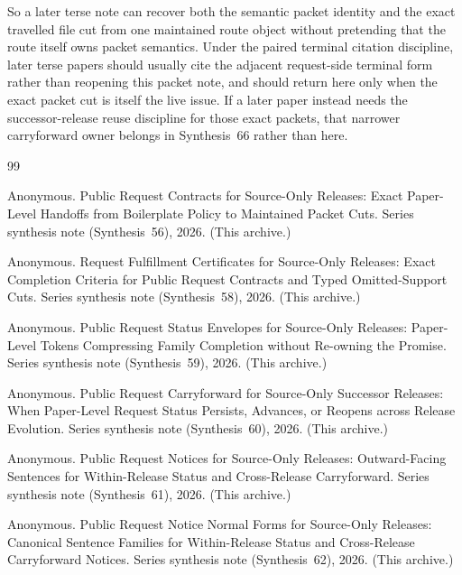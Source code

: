 \documentclass[11pt]{article}
\begin{document}
So a later terse note can recover both the semantic packet identity and the exact travelled file cut from one maintained route object without pretending that the route itself owns packet semantics. Under the paired terminal citation discipline, later terse papers should usually cite the adjacent request-side terminal form rather than reopening this packet note, and should return here only when the exact packet cut is itself the live issue.\cite{series:pairedterminalcitationdiscipline,series:pairedterminalcutoverrules} If a later paper instead needs the successor-release reuse discipline for those exact packets, that narrower carryforward owner belongs in Synthesis~66 rather than here.

\begin{thebibliography}{99}\small

Anonymous.
\newblock Public Request Contracts for Source-Only Releases: Exact Paper-Level Handoffs from Boilerplate Policy to Maintained Packet Cuts.
\newblock Series synthesis note (Synthesis~56), 2026. (This archive.)

Anonymous.
\newblock Request Fulfillment Certificates for Source-Only Releases: Exact Completion Criteria for Public Request Contracts and Typed Omitted-Support Cuts.
\newblock Series synthesis note (Synthesis~58), 2026. (This archive.)

Anonymous.
\newblock Public Request Status Envelopes for Source-Only Releases: Paper-Level Tokens Compressing Family Completion without Re-owning the Promise.
\newblock Series synthesis note (Synthesis~59), 2026. (This archive.)

Anonymous.
\newblock Public Request Carryforward for Source-Only Successor Releases: When Paper-Level Request Status Persists, Advances, or Reopens across Release Evolution.
\newblock Series synthesis note (Synthesis~60), 2026. (This archive.)

Anonymous.
\newblock Public Request Notices for Source-Only Releases: Outward-Facing Sentences for Within-Release Status and Cross-Release Carryforward.
\newblock Series synthesis note (Synthesis~61), 2026. (This archive.)

Anonymous.
\newblock Public Request Notice Normal Forms for Source-Only Releases: Canonical Sentence Families for Within-Release Status and Cross-Release Carryforward Notices.
\newblock Series synthesis note (Synthesis~62), 2026. (This archive.)


\end{thebibliography}
\end{document}
